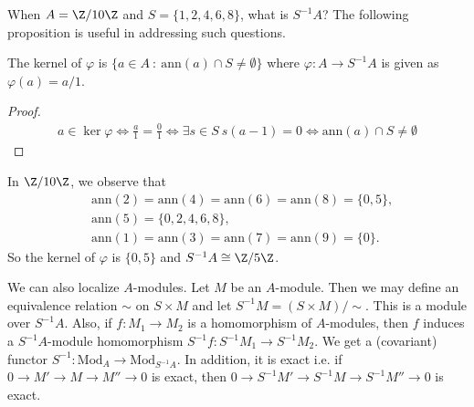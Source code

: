 \noindent
When $A = \Z/10\Z$ and $S = \{1,2,4,6,8\}$, what is $S^{-1}A$? The following proposition is useful in addressing such questions.
\begin{proposition}
    The kernel of $\varphi$ is $\{a \in A \ : \ \mathrm{ann}(a) \cap S \neq \emptyset\}$ where $\varphi: A \rightarrow S^{-1}A$ is given as $\varphi(a) = a/1$.
\end{proposition}
\begin{proof}
    \begin{align*}
        a \in \ker \varphi \Leftrightarrow \frac{a}{1} = \frac{0}{1} \Leftrightarrow \exists s\in S \ s(a-1) = 0 \Leftrightarrow \mathrm{ann}(a) \cap S \neq \emptyset
    \end{align*}
\end{proof}
\noindent
In $\Z/10\Z$, we observe that
\begin{align*}
    &\mathrm{ann}(2) = \mathrm{ann}(4) = \mathrm{ann}(6) = \mathrm{ann}(8) = \{0, 5\},\\
    &\mathrm{ann}(5) = \{0,2,4,6,8\},\\
    &\mathrm{ann}(1) = \mathrm{ann}(3) = \mathrm{ann}(7) = \mathrm{ann}(9) = \{0\}.
\end{align*}
So the kernel of $\varphi$ is $\{0,5\}$ and $S^{-1}A \cong \Z/5\Z$.

We can also localize $A$-modules. Let $M$ be an $A$-module. Then we may define an equivalence relation $\sim$ on $S \times M$ and let $S^{-1}M = (S \times M)/\sim$. This is a module over $S^{-1}A$. Also, if $f: M_1 \rightarrow M_2$ is a homomorphism of $A$-modules, then $f$ induces a $S^{-1}A$-module homomorphism $S^{-1}f: S^{-1}M_1 \rightarrow S^{-1}M_2$. We get a (covariant) functor $S^{-1}: \mathrm{Mod}_A \rightarrow \mathrm{Mod}_{S^{-1}A}$. In addition, it is exact i.e. if $0 \rightarrow M' \rightarrow M \rightarrow M'' \rightarrow 0$ is exact, then $0 \rightarrow S^{-1}M' \rightarrow S^{-1}M \rightarrow S^{-1}M'' \rightarrow 0$ is exact.
\clearpage